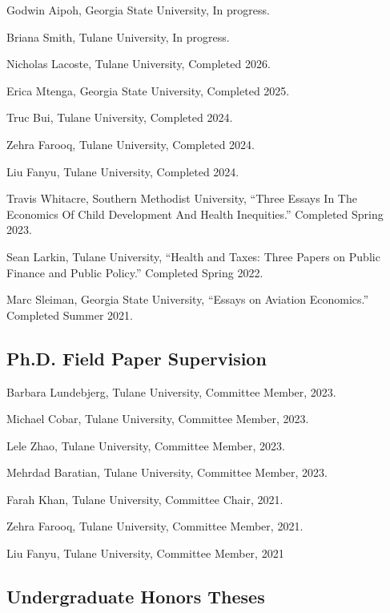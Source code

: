 \documentclass[12pt,letterpaper]{article}
\renewenvironment{itemize}{
	\begin{list}{}{
			\setlength{\leftmargin}{1em}
			\setlength{\itemsep}{0.15em}
			\setlength{\parskip}{0pt}
			\setlength{\parsep}{0.2em}
		}
	}{
	\end{list}
}
\begin{document}
\begin{itemize}
	\item Godwin Aipoh, Georgia State University, In progress. 
	\item Briana Smith, Tulane University, In progress. 
	\item Nicholas Lacoste, Tulane University, Completed 2026.
	\item Erica Mtenga, Georgia State University, Completed 2025. 
	\item Truc Bui, Tulane University, Completed 2024.
	\item Zehra Farooq, Tulane University, Completed 2024.
	\item Liu Fanyu, Tulane University, Completed 2024.
	\item Travis Whitacre, Southern Methodist University, ``Three Essays In The Economics Of Child Development And Health Inequities.'' Completed Spring 2023. 
	\item Sean Larkin, Tulane University, ``Health and Taxes: Three Papers on Public Finance and Public Policy.'' Completed Spring 2022. 
	\item Marc Sleiman, Georgia State University, ``Essays on Aviation Economics.''  Completed Summer 2021. 
\end{itemize}

\subsection*{Ph.D. Field Paper Supervision}
\begin{itemize} 
\item Barbara Lundebjerg, Tulane University, Committee Member,  2023. 
\item Michael Cobar, Tulane University, Committee Member,  2023. 
\item Lele Zhao, Tulane University, Committee Member,  2023. 
\item Mehrdad Baratian, Tulane University, Committee Member,  2023. 
\item Farah Khan, Tulane University, Committee Chair, 2021. 
\item Zehra Farooq, Tulane University, Committee Member,  2021. 
\item Liu Fanyu, Tulane University, Committee Member, 2021
\end{itemize}

\subsection*{Undergraduate Honors Theses}
\end{document}
